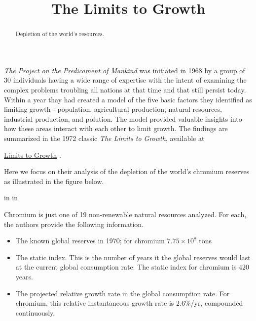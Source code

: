 \documentclass{ximera}
\title{The Limits to Growth}
\newcommand{\pskip}{\vskip 0.1 in}
\begin{document}
\begin{abstract}
Depletion of the world's resources.
\end{abstract}
\maketitle


\emph{The Project on the Predicament of Mankind} was initiated in 1968 by a group of 30 individuals having a wide range of expertise with the intent of examining the complex problems troubling all nations at that time and that still persist today. Within a year thay had created a model of the five basic factors they identified as limiting growth  - population, agricultural production, natural resources, industrial production, and polution. The model  provided valuable insights into how these areas interact with each other to limit growth. The findings are summarized in the 1972 classic \emph{The Limits to Growth}, available at

\href{https://www.library.dartmouth.edu/digital/digital-collections/limits-growth}{Limits to Growth} .

Here we focus on their analysis of the depletion of the world's chromium reserves as illustrated in the figure below. %

 
\begin{onlineOnly}
    \begin{center}
\end{center}
\end{onlineOnly}




\pskip \pskip

Chromium is just one of 19 non-renewable natural resources analyzed. For each, the authors provide the following information.

\begin{itemize}
\item{The known global reserves in 1970; for chromium $7.75\times 10^8$ tons}

\item{The static index. This is the number of years it the global reserves would last at the current global consumption rate. The static index for chromium is $420$ years.}

\item{The projected relative growth rate in the global consumption rate. For chromium, this relative instantaneous growth rate is $2.6\%$/yr, compounded continuously.}

\end{itemize}
\end{document}
